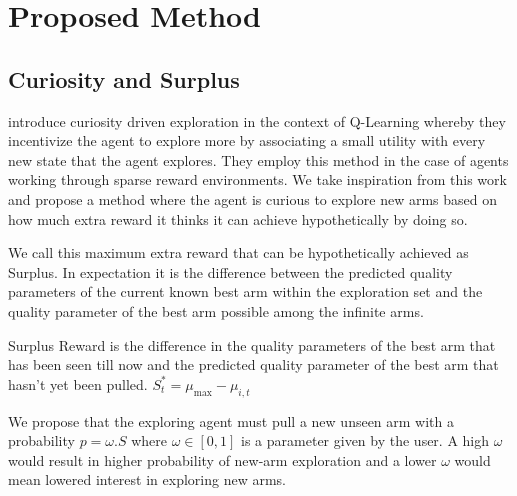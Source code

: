 \section{Proposed Method}

\subsection{Curiosity and Surplus}
 introduce curiosity driven exploration in the context of Q-Learning whereby they incentivize the agent to explore more by associating a small utility with every new state that the agent explores. They employ this method in the case of agents working through sparse reward environments. We take inspiration from this work and propose a method where the agent is curious to explore new arms based on how much extra reward it thinks it can achieve hypothetically by doing so.

We call this maximum extra reward that can be hypothetically achieved as Surplus. In expectation it is the difference between the predicted quality parameters of the current known best arm within the exploration set and the quality parameter of the best arm possible among the infinite arms.

\begin{definition}
    Surplus Reward is the difference in the quality parameters of the best arm that has been seen till now and the predicted quality parameter of the best arm that hasn't yet been pulled. $S^*_t = \mu_{\max} - \mu_{i,t}$
\end{definition}

We propose that the exploring agent must pull a new unseen arm with a probability $p = \omega.S$ where $\omega \in [0,1]$ is a parameter given by the user. A high $\omega$ would result in higher probability of new-arm exploration and a lower $\omega$ would mean lowered interest in exploring new arms.

